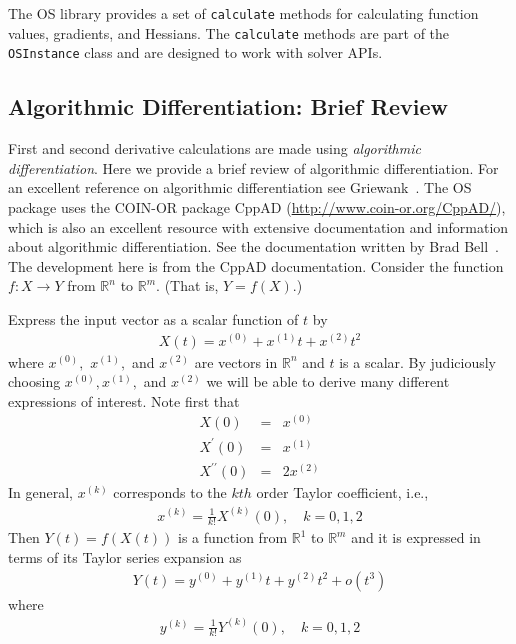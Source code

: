 \documentclass[11pt]{article}
\renewcommand{\_}{{\char"5F}}
\renewcommand{\{}{{\char"7B}}
\renewcommand{\}}{{\char"7D}}
\renewcommand{\^}{{\char"0D}}
\renewcommand{\'}{{\char"0D}}
\begin{document}
\begin{enumerate}[Step 1:]
The OS library provides a set of {\tt calculate} methods for calculating  function values, gradients, and Hessians.     
The {\tt calculate} methods are part of the {\tt OSInstance} class and are designed to work with solver APIs.



\subsection{Algorithmic Differentiation:  Brief Review}\label{section:adtheory}

First and second derivative calculations are made using 
{\it algorithmic differentiation}.  
Here we provide a brief review of algorithmic differentiation.  For an excellent reference on algorithmic differentiation 
see Griewank~\cite{griewank2000}.  The OS package uses the COIN-OR package CppAD 
(\url{http://www.coin-or.org/CppAD/}), which  is also an excellent resource with extensive  documentation and information 
about algorithmic differentiation. 
See the documentation written by  Brad Bell~\cite{bell2007}.    The development here is from the 
CppAD documentation.  Consider the function $f:X \rightarrow Y$ from $ \mathbb{R}^{n}$ to $ \mathbb{R}^{m}.$ 
(That is, $Y = f(X).$)

Express the input vector as a scalar function of $t$ by
\begin{eqnarray}
X(t) = x^{(0)} +  x^{(1)} t +  x^{(2)} t^{2}
\end{eqnarray}
where $ x^{(0)},$ $x^{(1)},$ and $x^{(2)}$ are vectors in $ \mathbb{R}^{n}$  and $t$ is a scalar.  By judiciously choosing $x^{(0)}, x^{(1)},$ and $x^{(2)}$ we will be able to derive many different expressions of interest.  Note first that
\begin{eqnarray*}
X(0) &=& x^{(0)} \\
X^{\prime}(0) &=& x^{(1)} \\
X^{\prime \prime }(0) &=& 2 x^{(2)}
\end{eqnarray*}
In general,  $x^{(k)}$ corresponds to the $kth$ order Taylor coefficient, i.e.,
\begin{eqnarray}
x^{(k)} = \frac{1}{k!}X^{(k)}(0), \quad k = 0, 1, 2  \label{eq:xTaylorCoeff}
\end{eqnarray}
Then $Y(t) = f(X(t))$ is a function from $ \mathbb{R}^{1}$ to $ \mathbb{R}^{m}$ and it is expressed in terms of its Taylor series expansion as
\begin{eqnarray}
Y(t)  = y^{(0)} +  y^{(1)} t +  y^{(2)} t^{2} + o(t^{3})
\end{eqnarray}
where
\begin{eqnarray}
y^{(k)} = \frac{1}{k!} Y^{(k)}(0), \quad k = 0, 1, 2  \label{eq:yTaylorCoeff}
\end{eqnarray}




\end{enumerate}
\end{document}
